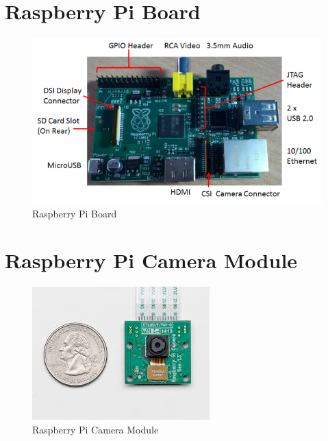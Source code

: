 \documentclass[12pt, a4paper]{article}
\begin{document}
\begin{appendices}
\section{Raspberry Pi Board}
\begin{figure}[htp]
\centering
\includegraphics[scale=1.00]{RPiModelB.png}
\caption{Raspberry Pi Board}
\label{}
\end{figure}

\newpage
\section{Raspberry Pi Camera Module}
\begin{figure}[htp]
\centering
\includegraphics[scale=1.00]{index.jpeg}
\caption{Raspberry Pi Camera Module}
\label{}
\end{figure}
\newpage

\end{appendices}
\end{document}
